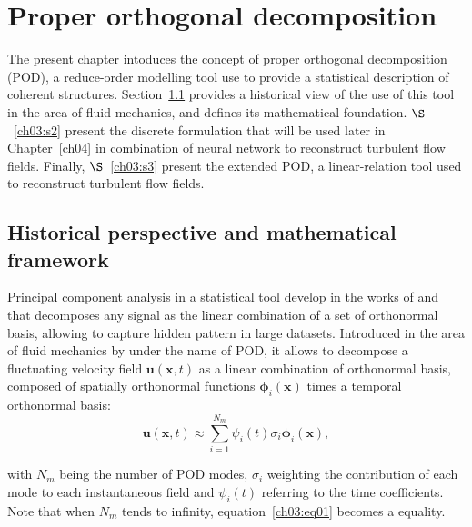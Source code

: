 \chapter{Proper orthogonal decomposition}\label{ch03}

The present chapter intoduces the concept of proper orthogonal decomposition (POD), a reduce-order modelling tool use to provide a statistical description of coherent structures.
Section~\ref{ch03:s1} provides a historical view of the use of this tool in the area of fluid mechanics, and defines its mathematical foundation.
$\S$~\ref{ch03:s2} present the discrete formulation that will be used later in Chapter~\ref{ch04} in combination of neural network to reconstruct turbulent flow fields.
Finally, $\S$~\ref{ch03:s3} present the extended POD, a linear-relation tool used to reconstruct turbulent flow fields.

\section{Historical perspective and mathematical framework}\label{ch03:s1}
Principal component analysis in a statistical tool develop in the works of \citet{pearson1901liii} and \citet{hotelling1933analysis} that decomposes any signal as the linear combination of a set of orthonormal basis, allowing to capture hidden pattern in large datasets.
Introduced in the area of fluid mechanics by \citet{lumley1967structure} under the name of POD, it allows to decompose a fluctuating velocity field $\boldsymbol{u}(\boldsymbol{x}, t)$ as a linear combination of orthonormal basis, composed of spatially orthonormal functions $\boldsymbol{\phi}_i(\boldsymbol{x})$ times a temporal orthonormal basis:
\begin{equation}
  \boldsymbol{u}(\boldsymbol{x}, t) \approx \sum_{i=1}^{N_m} \psi_i(t) \sigma_i \boldsymbol{\phi}_i(\boldsymbol{x}),
  \label{ch03:eq01}
\end{equation}

\noindent with $N_m$ being the number of POD modes, $\sigma_i$ weighting the contribution of each mode to each instantaneous field and $\psi_i(t)$ referring to the time coefficients.
Note that when $N_m$ tends to infinity, equation~\ref{ch03:eq01} becomes a equality.

